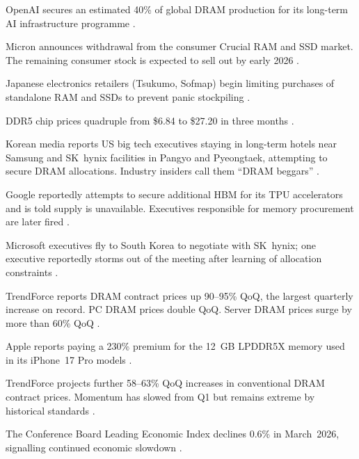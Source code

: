 \documentclass[12pt]{article}
\theoremstyle{definition}
\begin{document}
\begin{description}[itemsep=4pt]
\item[October 2025:] OpenAI secures an estimated 40\% of global DRAM production for its long-term AI infrastructure programme \cite{ColdFusion2026}.

\item[Late 2025:] Micron announces withdrawal from the consumer Crucial RAM and SSD market. The remaining consumer stock is expected to sell out by early 2026 \cite{ColdFusion2026}.

\item[November 2025:] Japanese electronics retailers (Tsukumo, Sofmap) begin limiting purchases of standalone RAM and SSDs to prevent panic stockpiling \cite{IntuitionLabs2025}.

\item[December 2025:] DDR5 chip prices quadruple from \$6.84 to \$27.20 in three months \cite{Sourceability2026}.

\item[January 2026:] Korean media reports US big tech executives staying in long-term hotels near Samsung and SK~hynix facilities in Pangyo and Pyeongtaek, attempting to secure DRAM allocations. Industry insiders call them ``DRAM beggars'' \cite{TrendForce2026Jan}.

\item[January 2026:] Google reportedly attempts to secure additional HBM for its TPU accelerators and is told supply is unavailable. Executives responsible for memory procurement are later fired \cite{ColdFusion2026}.

\item[January 2026:] Microsoft executives fly to South Korea to negotiate with SK~hynix; one executive reportedly storms out of the meeting after learning of allocation constraints \cite{ColdFusion2026}.

\item[Q1 2026:] TrendForce reports DRAM contract prices up 90--95\% QoQ, the largest quarterly increase on record. PC DRAM prices double QoQ. Server DRAM prices surge by more than 60\% QoQ \cite{TrendForce2026Q1Rev}.

\item[Q1 2026:] Apple reports paying a 230\% premium for the 12~GB LPDDR5X memory used in its iPhone~17 Pro models \cite{ColdFusion2026}. 

\item[Q2 2026:] TrendForce projects further 58--63\% QoQ increases in conventional DRAM contract prices. Momentum has slowed from Q1 but remains extreme by historical standards \cite{TrendForce2026Q2}.

\item[Q2 2026:] The Conference Board Leading Economic Index declines 0.6\% in March~2026, signalling continued economic slowdown \cite{ConferenceBoard2026}.
\end{description}
\end{document}
